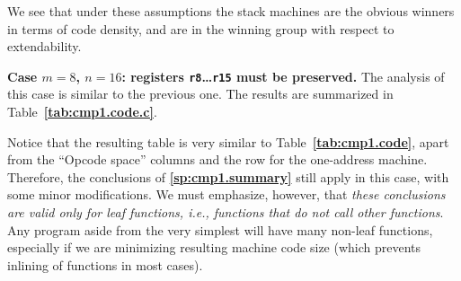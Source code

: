 \documentclass[12pt,oneside]{article}
\def\makepoint#1{\medbreak\noindent{\bf #1.\ }}
\def\nxsubpoint{\refstepcounter{subsubsection}%
    \smallbreak\makepoint{\thesubsubsection}}
\def\refpoint#1{{\rm\textbf{\ref{#1}}}}
\let\ptref=\refpoint
\def\emb#1{\textbf{#1.}}
\begin{document}
We see that under these assumptions the stack machines are the obvious winners in terms of code density, and are in the winning group with respect to extendability.

\nxsubpoint\label{sp:cmp1.8}\emb{Case $m=8$, $n=16$: registers \texttt{r8}\dots\texttt{r15} must be preserved}
The analysis of this case is similar to the previous one. The results are summarized in Table~\ptref{tab:cmp1.code.c}.

\begin{table}\caption{A summary of machine code properties for hypothetical 3-address, 2-address, 1-address and stack machines, generated for a sample leaf function (cf.~\ptref{sp:cmp1.source}), assuming that only the last 8 of the 16 registers must be preserved by called functions ($m=8$, $n=16$). This table is similar to Table~\ptref{tab:cmp1.code.b}, but has smaller values of $r$.}\label{tab:cmp1.code.c}
\end{table}

Notice that the resulting table is very similar to Table~\ptref{tab:cmp1.code}, apart from the ``Opcode space'' columns and the row for the one-address machine. Therefore, the conclusions of \ptref{sp:cmp1.summary} still apply in this case, with some minor modifications. We must emphasize, however, that {\em these conclusions are valid only for leaf functions, i.e., functions that do not call other functions}. Any program aside from the very simplest will have many non-leaf functions, especially if we are minimizing resulting machine code size (which prevents inlining of functions in most cases).
\end{document}
